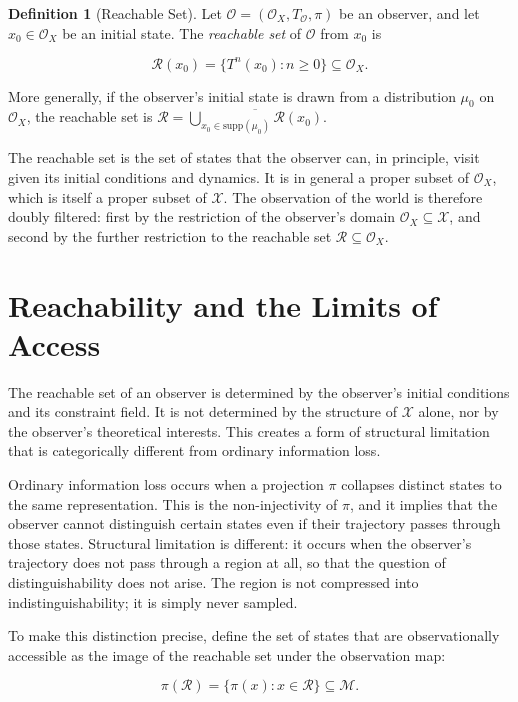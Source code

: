 \documentclass[12pt, a4paper, oneside]{article}
\theoremstyle{plain}
\theoremstyle{definition}
\newtheorem{definition}[theorem]{Definition}
\theoremstyle{remark}
\newcommand{\X}{\mathcal{X}}
\newcommand{\M}{\mathcal{M}}
\newcommand{\Obs}{\mathcal{O}}
\newcommand{\R}{\mathcal{R}}
\newcommand{\T}{T}
\newcommand{\proj}{\pi}
\begin{document}
\begin{definition}[Reachable Set]
Let $\Obs = (\Obs_X, \T_\Obs, \proj)$ be an observer, and let $x_0 \in \Obs_X$ be an initial state. The \emph{reachable set} of $\Obs$ from $x_0$ is

\begin{equation}
\R(x_0) = \{\T^n(x_0) : n \geq 0\} \subseteq \Obs_X.
\end{equation}

More generally, if the observer's initial state is drawn from a distribution $\mu_0$ on $\Obs_X$, the reachable set is $\R = \overline{\bigcup_{x_0 \in \mathrm{supp}(\mu_0)} \R(x_0)}$.
\end{definition}

The reachable set is the set of states that the observer can, in principle, visit given its initial conditions and dynamics. It is in general a proper subset of $\Obs_X$, which is itself a proper subset of $\X$. The observation of the world is therefore doubly filtered: first by the restriction of the observer's domain $\Obs_X \subseteq \X$, and second by the further restriction to the reachable set $\R \subseteq \Obs_X$.

\section{Reachability and the Limits of Access}

The reachable set of an observer is determined by the observer's initial conditions and its constraint field. It is not determined by the structure of $\X$ alone, nor by the observer's theoretical interests. This creates a form of structural limitation that is categorically different from ordinary information loss.

Ordinary information loss occurs when a projection $\proj$ collapses distinct states to the same representation. This is the non-injectivity of $\proj$, and it implies that the observer cannot distinguish certain states even if their trajectory passes through those states. Structural limitation is different: it occurs when the observer's trajectory does not pass through a region at all, so that the question of distinguishability does not arise. The region is not compressed into indistinguishability; it is simply never sampled.

To make this distinction precise, define the set of states that are observationally accessible as the image of the reachable set under the observation map:

\begin{equation}
\proj(\R) = \{\proj(x) : x \in \R\} \subseteq \M.
\end{equation}
\end{document}
